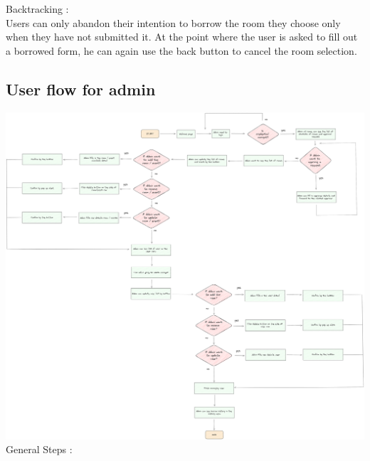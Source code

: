 \documentclass[12pt,titlepage,a4paper]{report}
\begin{document}
    Backtracking :\\
    Users can only abandon their intention to borrow the room they choose only when they have not submitted it. At the point where the user is asked to fill out a borrowed form, he can again use the back button to cancel the room selection.
    \subsection{User flow for admin}
    \noindent
    \includegraphics[width=\textwidth]{images/figures/UIUX/Untitled 6.png}
    General Steps :
\end{document}
